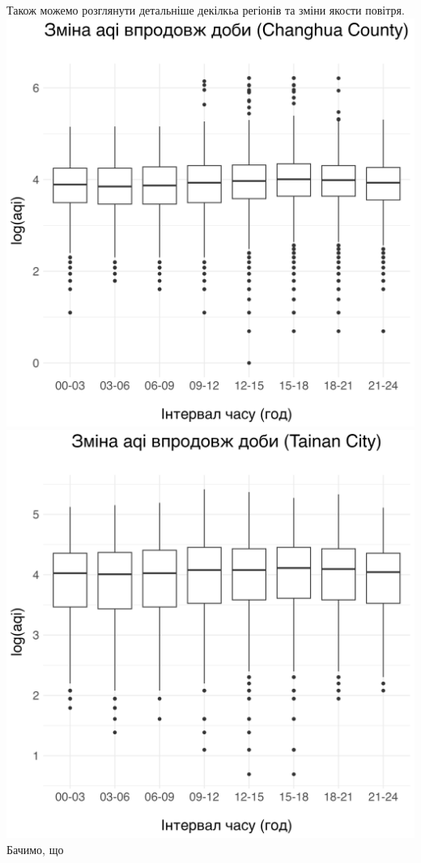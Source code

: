 \documentclass[./report.tex]{subfiles}
\begin{document}
\begin{enumerate}
    Також можемо розглянути детальніше декілкьа регіонів та зміни якости повітря. 
    \includegraphics[width=6in]{plots/question3/county-box/Changhua County.png}
    \includegraphics[width=6in]{plots/question3/county-box/Tainan City.png}
    Бачимо, що 


\end{enumerate}
\end{document}
